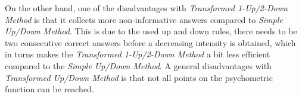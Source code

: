 On the other hand, one of the disadvantages with \textit{Transformed 1-Up/2-Down Method} is that it collects more non-informative answers compared to \textit{Simple Up/Down Method}. This is due to the used up and down rules, there needs to be two consecutive correct answers before a decreasing intensity is obtained, which in turns makes the \textit{Transformed 1-Up/2-Down Method} a bit less efficient compared to the \textit{Simple Up/Down Method}. A general disadvantages with \textit{Transformed Up/Down Method} is that not all points on the psychometric function can be reached.          







